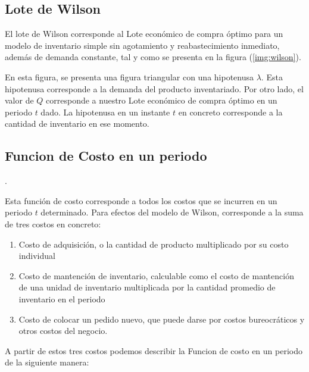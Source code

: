 \subsection{Lote de Wilson}
El lote de Wilson corresponde al Lote económico de compra óptimo para un modelo de inventario simple sin agotamiento y reabastecimiento inmediato, además de demanda constante, tal y como se presenta en la figura (\ref{img:wilson}).

En esta figura, se presenta una figura triangular con una hipotenusa $\lambda$. Esta hipotenusa corresponde a la demanda del producto inventariado. Por otro lado, el valor de $Q$ corresponde a nuestro Lote económico de compra óptimo en un periodo $t$ dado. La hipotenusa en un instante $t$ en concreto corresponde a la cantidad de inventario en ese momento.

\subsection{Funcion de Costo en un periodo}.

Esta función de costo corresponde a todos los costos que se incurren en un periodo $t$ determinado. Para efectos del modelo de Wilson, corresponde a la suma de tres costos en concreto:

\begin{enumerate}
    \item Costo de adquisición, o la cantidad de producto multiplicado por su costo individual
    \item Costo de mantención de inventario, calculable como el costo de mantención de una unidad de inventario multiplicada por la cantidad promedio de inventario en el periodo
    \item Costo de colocar un pedido nuevo, que puede darse por costos bureocráticos y otros costos del negocio.
\end{enumerate}

A partir de estos tres costos podemos describir la Funcion de costo en un periodo de la siguiente manera:\\ \\



